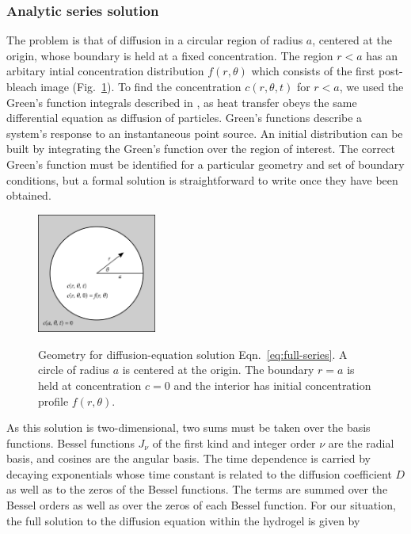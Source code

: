 \subsubsection{Analytic series solution}

The problem is that of diffusion in a circular region of radius $a$, centered at the origin, whose boundary is held at a fixed concentration.  The region $r<a$ has an arbitary intial concentration distribution $f(r,\theta)$ which consists of the first post-bleach image (Fig.~\ref{fig:carslaw-geo}).  To find the concentration $c(r,\theta,t)$ for $r<a$, we used the Green's function integrals described in \cite{h.s.carslaw59}, as heat transfer obeys the same differential equation as diffusion of particles.  Green's functions describe a system's response to an instantaneous point source.  An initial distribution can be built by integrating the Green's function over the region of interest.  The correct Green's function must be identified for a particular geometry and set of boundary conditions, but a formal solution is straightforward to write once they have been obtained.

\begin{figure}
\caption{Geometry for diffusion-equation solution Eqn.~\ref{eq:full-series}.  A circle of radius $a$ is centered at the origin.  The boundary $r=a$ is held at concentration $c=0$ and the interior has initial concentration profile $f(r,\theta)$.}
\centering
\includegraphics[width=0.35\textwidth]{figs/ch04/carslaw-geometry}
\label{fig:carslaw-geo}
\end{figure} 

As this solution is two-dimensional, two sums must be taken over the basis functions.  Bessel functions $J_\nu$ of the first kind and integer order $\nu$ are the radial basis, and cosines are the angular basis.  The time dependence is carried by decaying exponentials whose time constant is related to the diffusion coefficient $D$ as well as to the zeros of the Bessel functions.  The terms are summed over the Bessel orders as well as over the zeros of each Bessel function.  For our situation, the full solution to the diffusion equation within the hydrogel is given by \cite{h.s.carlslaw59}

